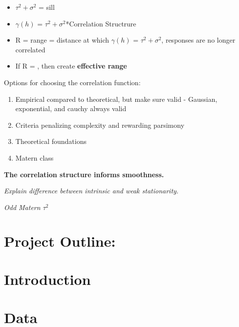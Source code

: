 \documentclass[a4paper]{article}\usepackage[]{graphicx}\usepackage[]{color}
\begin{document}
\begin{itemize}
\begin{itemize}
\item $\tau^{2} + \sigma^{2}$ = sill

\item $\gamma(h)$ = $\tau^{2} + \sigma^{2}$*Correlation Structrure

\item R = range = distance at which $\gamma(h)$ = $\tau^{2} + \sigma^{2}$, responses are no longer correlated

\item If R = \inf, then create {\bf effective range}

\end{itemize}

\end{itemize}

Options for choosing the correlation function:

\begin{enumerate}
\item Empirical compared to theoretical, but make sure valid - Gaussian, exponential, and cauchy always valid

\item Criteria penalizing complexity and rewarding parsimony

\item Theoretical foundations

\item Matern class

\end{enumerate}

{\bf The correlation structure informs smoothness.}

{\it Explain difference between intrinsic and weak stationarity.}

{\it Odd Matern $\tau^{2}$}


\newpage
\section*{Project Outline:}
\section{Introduction}

\section{Data}

\end{document}
